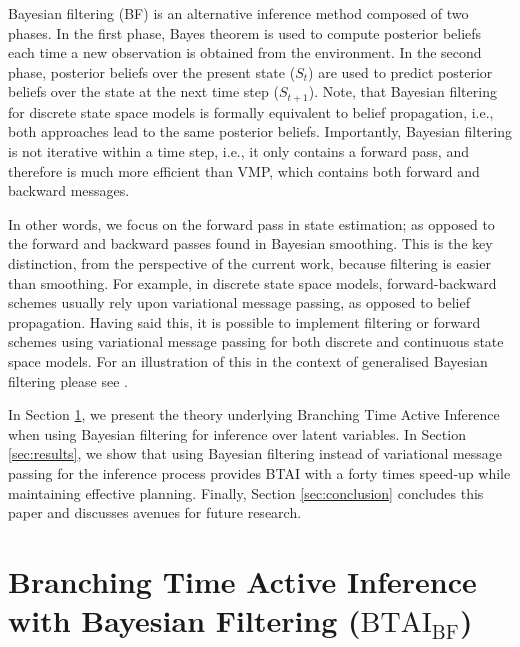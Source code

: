 \documentclass[twoside,11pt]{article}
\begin{document}
Bayesian filtering (BF) \citep{BAYESIAN_FILTERING} is an alternative inference method composed of two phases. In the first phase, Bayes theorem is used to compute posterior beliefs each time a new observation is obtained from the environment. In the second phase, posterior beliefs over the present state ($S_t$) are used to predict posterior beliefs over the state at the next time step ($S_{t+1}$). Note, that Bayesian filtering for discrete state space models is formally equivalent to belief propagation, i.e., both approaches lead to the same posterior beliefs. Importantly, Bayesian filtering is not iterative within a time step, i.e., it only contains a forward pass, and therefore is much more efficient than VMP, which contains both forward and backward messages.

In other words, we focus on the forward pass in state estimation; as opposed to the forward and backward passes found in Bayesian smoothing. This is the key distinction, from the perspective of the current work, because filtering is easier than smoothing. For example, in discrete state space models, forward-backward schemes usually rely upon variational message passing, as opposed to belief propagation. Having said this, it is possible to implement filtering or forward schemes using variational message passing for both discrete and continuous state space models. For an illustration of this in the context of generalised Bayesian filtering please see \citep{believe}.

In Section \ref{sec:ai_ts}, we present the theory underlying Branching Time Active Inference when using Bayesian filtering for inference over latent variables. In Section \ref{sec:results}, we show that using Bayesian filtering instead of variational message passing for the inference process provides BTAI with a forty times speed-up while maintaining effective planning. Finally, Section \ref{sec:conclusion} concludes this paper and discusses avenues for future research.

\section{Branching Time Active Inference with Bayesian Filtering ($\text{BTAI}_{\text{BF}}$)} \label{sec:ai_ts}
\end{document}
